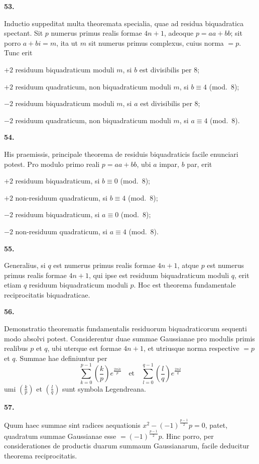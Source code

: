 \documentclass[12pt,a4paper]{article}
\newcommand{\art}[1]{\begin{center}\textbf{#1.}\end{center}}
\begin{document}
\art{53}

Inductio suppeditat multa theoremata specialia, quae ad residua biquadratica spectant. Sit $p$ numerus primus realis formae $4n+1$, adeoque $p=aa+bb$; sit porro $a+bi=m$, ita ut $m$ sit numerus primus complexus, cuius norma $=p$. Tunc erit

$+2$ residuum biquadraticum moduli $m$, si $b$ est divisibilis per $8$;

$+2$ residuum quadraticum, non biquadraticum moduli $m$, si $b\equiv 4$ (mod.~$8$);

$-2$ residuum biquadraticum moduli $m$, si $a$ est divisibilis per $8$;

$-2$ residuum quadraticum, non biquadraticum moduli $m$, si $a\equiv 4$ (mod.~$8$).

\art{54}

His praemissis, principale theorema de residuis biquadraticis facile enunciari potest. Pro modulo primo reali $p=aa+bb$, ubi $a$ impar, $b$ par, erit

$+2$ residuum biquadraticum, si $b\equiv 0$ (mod.~$8$);

$+2$ non-residuum quadraticum, si $b\equiv 4$ (mod.~$8$);

$-2$ residuum biquadraticum, si $a\equiv 0$ (mod.~$8$);

$-2$ non-residuum quadraticum, si $a\equiv 4$ (mod.~$8$).

\art{55}

Generalius, si $q$ est numerus primus realis formae $4n+1$, atque $p$ est numerus primus realis formae $4n+1$, qui ipse est residuum biquadraticum moduli $q$, erit etiam $q$ residuum biquadraticum moduli $p$. Hoc est theorema fundamentale reciprocitatis biquadraticae.

\art{56}

Demonstratio theorematis fundamentalis residuorum biquadraticorum sequenti modo absolvi potest. Considerentur duae summae Gaussianae pro modulis primis realibus $p$ et $q$, ubi uterque est formae $4n+1$, et utriusque norma respective $=p$ et $q$. Summae hae definiuntur per
\[\sum_{k=0}^{p-1} \left(\frac{k}{p}\right) e^{\frac{2\pi i k}{p}}\quad\text{et}\quad\sum_{l=0}^{q-1} \left(\frac{l}{q}\right) e^{\frac{2\pi i l}{q}}\]
umi $\left(\frac{k}{p}\right)$ et $\left(\frac{l}{q}\right)$ sunt symbola Legendreana.

\art{57}

Quum haec summae sint radices aequationis $x^2-(-1)^{\frac{p-1}{2}}p=0$, patet, quadratum summae Gaussianae esse $=(-1)^{\frac{p-1}{2}}p$. Hinc porro, per considerationes de productis duarum summaum Gaussianarum, facile deducitur theorema reciprocitatis.
\end{document}
